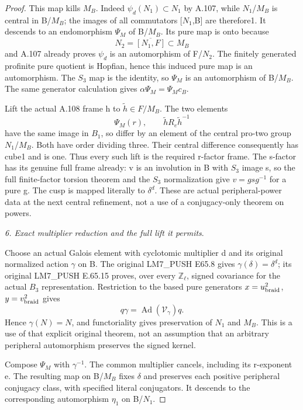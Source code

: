 \begin{proof}
This map kills \(M_B\). Indeed \(\psi_d(N_1)\subset N_1\) by A.107, while \(N_1\)/\(M_B\) is central in B/\(M_B\); the images of all commutators [\(N_1\),B] are therefore1. It descends to an endomorphism \(\Psi_M\) of B/\(M_B\). Its pure map is onto because
\[
N_2=\overline{[N_1,F]}\subset M_B
\]
and A.107 already proves \(\psi_d\) is an automorphism of F/\(N_2\). The finitely generated profinite pure quotient is Hopfian, hence this induced pure map is an automorphism. The \(S_3\) map is the identity, so \(\Psi_M\) is an automorphism of B/\(M_B\). The same generator calculation gives \(\alpha\Psi_M=\Psi_M c_B\).

Lift the actual A.108 frame h to \(\widetilde h\in F/M_B\). The two elements
\[
\Psi_M(r),\qquad \widetilde hR_e\widetilde h^{-1}
\]
have the same image in \(B_1\), so differ by an element of the central pro-two group \(N_1\)/\(M_B\). Both have order dividing three. Their central difference consequently has cube1 and is one. Thus every such lift is the required r-factor frame. The s-factor has its genuine full frame already: v is an involution in B with \(S_3\) image s, so the full finite-factor torsion theorem and the \(S_3\) normalization give \(v=gsg^{-1}\) for a pure g. The cusp is mapped literally to \(\delta^d\). These are actual peripheral-power data at the next central refinement, not a use of a conjugacy-only theorem on powers.

\medskip\noindent\emph{6. Exact multiplier reduction and the full lift it permits}.

Choose an actual Galois element with cyclotomic multiplier d and its original normalized action \(\gamma\) on B. The original LM7\_PUSH E65.8 gives \(\gamma(\delta)=\delta^d\); its original LM7\_PUSH E.65.15 proves, over every \(\mathbb Z_\ell\), signed covariance for the actual \(B_3\) representation. Restriction to the based pure generators \(x=u_{\rm braid}^2\), \(y=v_{\rm braid}^2\) gives
\[
q\gamma=\operatorname{Ad}(\mathcal V_\gamma)q.
\]
Hence \(\gamma(N)=N\), and functoriality gives preservation of \(N_1\) and \(M_B\). This is a use of that explicit original theorem, not an assumption that an arbitrary peripheral automorphism preserves the signed kernel.

Compose \(\Psi_M\) with \(\gamma^{-1}\). The common multiplier cancels, including its r-exponent e. The resulting map on B/\(M_B\) fixes \(\delta\) and preserves each positive peripheral conjugacy class, with specified literal conjugators. It descends to the corresponding automorphism \(\eta_1\) on B/\(N_1\).


\end{proof}

